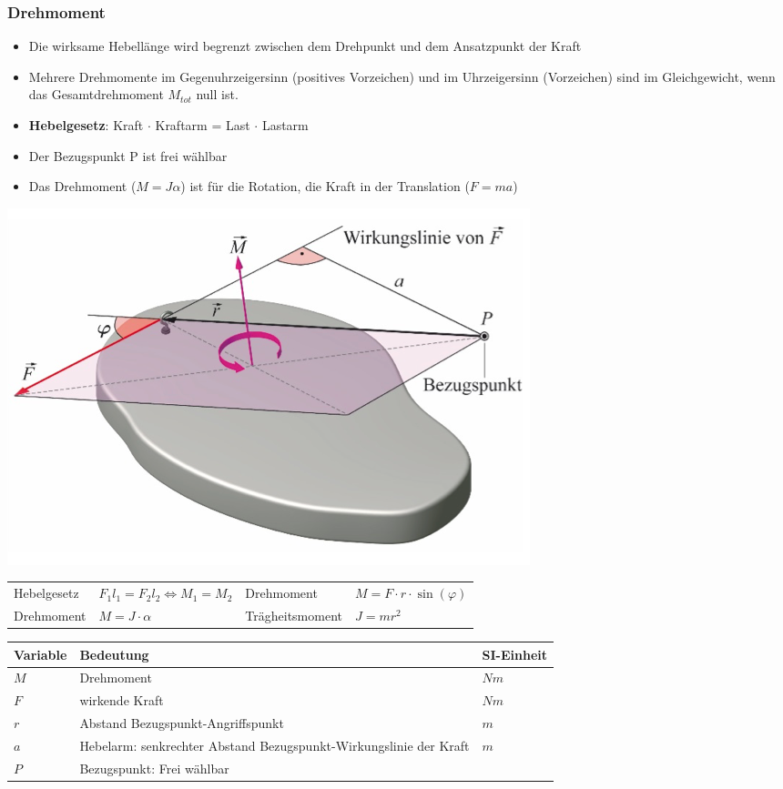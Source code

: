 \subsubsection{Drehmoment}

\begin{itemize}
	\item Die wirksame Hebellänge wird begrenzt zwischen dem Drehpunkt und dem Ansatzpunkt der Kraft
	\item Mehrere Drehmomente im Gegenuhrzeigersinn (positives Vorzeichen) und im Uhrzeigersinn (Vorzeichen) sind im Gleichgewicht, wenn das Gesamtdrehmoment $M_{tot}$ null ist.
	\item \textbf{Hebelgesetz}: Kraft $\cdot$ Kraftarm = Last $\cdot$ Lastarm
	\item Der Bezugspunkt P ist frei wählbar
	\item Das Drehmoment ($M = J \alpha$) ist für die Rotation, die Kraft in der Translation ($F = ma$)
\end{itemize}

\includegraphics[width=0.4\linewidth]{images/drehmoment}

\begin{tabbing}
	\begin{tabu} to \linewidth {l X l X}
		\toprule
		Hebelgesetz & $F_1l_1 = F_2l_2 \Leftrightarrow M_1 = M_2$ & 
		Drehmoment & $M = F \cdot r \cdot \sin(\varphi)$ \\
		Drehmoment & $M = J \cdot \alpha$ & 
		Trägheitsmoment & $J = m r^2$ \\
	\end{tabu}
\end{tabbing}

\begin{tabbing}
	\begin{tabu} to \linewidth {l X l}
		Variable & Bedeutung & SI-Einheit \\
		\midrule
		$M$ & Drehmoment & $Nm$ \\ 
		$F$ & wirkende Kraft & $Nm$ \\ 
		$r$ & Abstand Bezugspunkt-Angriffspunkt & $m$ \\ 
		$a$ & Hebelarm: senkrechter Abstand Bezugspunkt-Wirkungslinie der Kraft & $m$ \\ 
		$P$ & Bezugspunkt: Frei wählbar & \\
		\bottomrule
	\end{tabu}
\end{tabbing}


